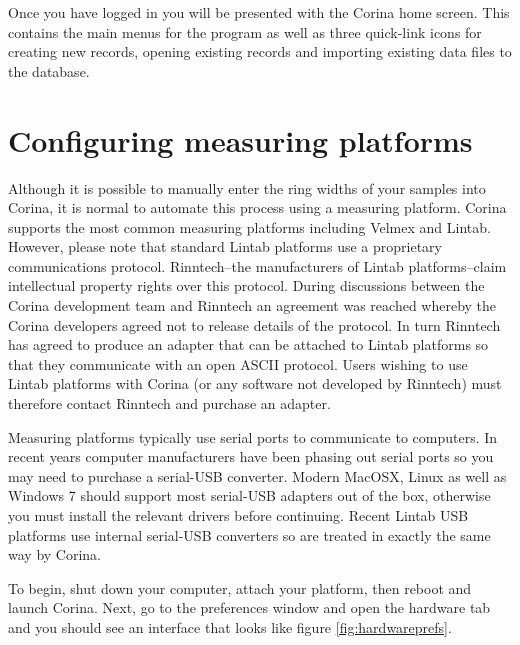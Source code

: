 Once you have logged in you will be presented with the Corina home screen.  This contains the main menus for the program as well as three quick-link icons for creating new records, opening existing records and importing existing data files to the database.


\section{Configuring measuring platforms}

Although it is possible to manually enter the ring widths of your samples into Corina, it is normal to automate this process using a measuring platform. Corina supports the most common measuring platforms including Velmex and Lintab.  However, please note that standard Lintab platforms use a proprietary communications protocol. Rinntech--the manufacturers of Lintab platforms--claim intellectual property rights over this protocol. During discussions between the Corina development team and Rinntech an agreement was reached whereby the Corina developers agreed not to release details of the protocol. In turn Rinntech has agreed to produce an adapter that can be attached to Lintab platforms so that they communicate with an open ASCII protocol. Users wishing to use Lintab platforms with Corina (or any software not developed by Rinntech) must therefore contact Rinntech and purchase an adapter.

Measuring platforms typically use serial ports to communicate to computers. In recent years computer manufacturers have been phasing out serial ports so you may need to purchase a serial-USB converter. Modern MacOSX, Linux as well as Windows 7 should support most serial-USB adapters out of the box, otherwise you must install the relevant drivers before continuing.  Recent Lintab USB platforms use internal serial-USB converters so are treated in exactly the same way by Corina.

To begin, shut down your computer, attach your platform, then reboot and launch Corina. Next, go to the preferences window and open the hardware tab and you should see an interface that looks like figure \ref{fig:hardwareprefs}.

